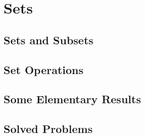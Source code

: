 \section{Sets}


\subsection{Sets and Subsets}

\subsection{Set Operations}

\subsection{Some Elementary Results}


\subsection{Solved Problems}